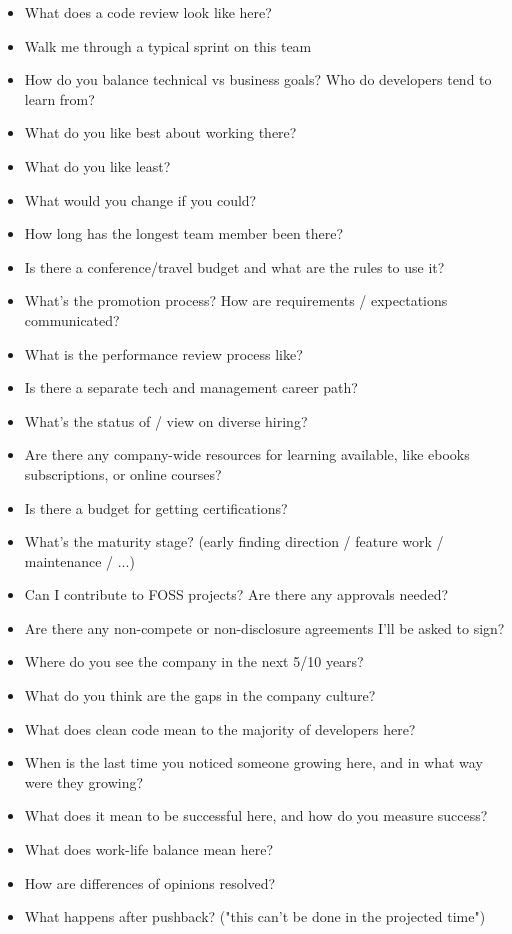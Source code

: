 \documentclass{article}
\begin{document}
\begin{itemize}
\item What does a code review look like here?
\item Walk me through a typical sprint on this team
\item How do you balance technical vs business goals? Who do developers tend to learn from?
\item What do you like best about working there?
\item What do you like least?
\item What would you change if you could?
\item How long has the longest team member been there?
\item Is there a conference/travel budget and what are the rules to use it?
\item What's the promotion process? How are requirements / expectations communicated?
\item What is the performance review process like?
\item Is there a separate tech and management career path?
\item What's the status of / view on diverse hiring?
\item Are there any company-wide resources for learning available, like ebooks subscriptions, or online courses?
\item Is there a budget for getting certifications?
\item What's the maturity stage? (early finding direction / feature work / maintenance / ...)
\item Can I contribute to FOSS projects? Are there any approvals needed?
\item Are there any non-compete or non-disclosure agreements I'll be asked to sign?
\item Where do you see the company in the next 5/10 years? 
\item What do you think are the gaps in the company culture?
\item What does clean code mean to the majority of developers here?
\item When is the last time you noticed someone growing here, and in what way were they growing?
\item What does it mean to be successful here, and how do you measure success?
\item What does work-life balance mean here?
\item How are differences of opinions resolved?
\item What happens after pushback? ("this can't be done in the projected time")

\end{itemize}
\end{document}
